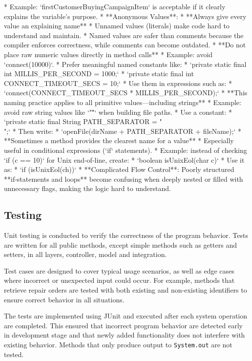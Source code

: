 \documentclass[a4paper]{scrartcl}
\begin{document}
        *   Example: `firstCustomerBuyingCampaignItem` is acceptable if it clearly explains the variable’s purpose.
* **Anonymous Values**:
  *   **Always give every value an explaining name**
      *   Unnamed values (literals) make code hard to understand and maintain.
      *   Named values are safer than comments because the compiler enforces correctness, while comments can become outdated.
  *   **Do not place raw numeric values directly in method calls**
      *   Example: avoid `connect(10000)`.
      *   Prefer meaningful named constants like:
          *   `private static final int MILLIS_PER_SECOND = 1000;`
          *   `private static final int CONNECT_TIMEOUT_SECS = 10;`
      *   Use them in expressions such as:
          *   `connect(CONNECT_TIMEOUT_SECS * MILLIS_PER_SECOND);`
  *   **This naming practice applies to all primitive values—including strings**
      *   Example: avoid raw string values like `"\""` when building file paths.
      *   Use a constant:
          *   `private static final String PATH_SEPARATOR = "\\";`
      *   Then write:
          *   `openFile(dirName + PATH_SEPARATOR + fileName);`
  *   **Sometimes a method provides the clearest name for a value**
      *   Especially useful in conditional expressions (`if` statements).
      *   Example: instead of checking `if (c == 10)` for Unix end‑of‑line, create:
          *   `boolean isUnixEol(char c)`
      *   Use it as:
          *   `if (isUnixEol(ch))`
* **Complicated Flow Control**: Poorly structured **if‑statements and loops** become confusing when deeply nested or filled with unnecessary flags, making the logic hard to understand.
\fi

\subsection{Testing}

Unit testing is conducted to verify the correctness of the program behavior. Tests are written for all public methods, except simple methods such as getters and setters, in all layers, controller, model and integration.

Test cases are designed to cover typical usage scenarios, as well as edge cases where incorrect or unexpected input could occur. For example, methods that retrieve repair orders are tested with both existing and non-existing identifiers to ensure correct behavior in all situations.

The tests are implemented using JUnit and executed after each system operation are completed. This ensured that incorrect program behavior are detected early in development stage and that newly added functionality does not interfere with existing behavior. Methods that only produce output to \texttt{System.out} are not tested.
\end{document}
